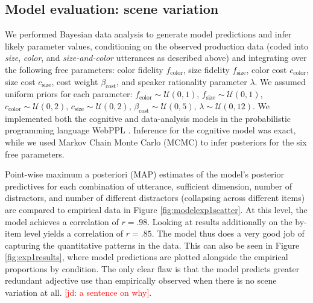 \documentclass[11pt]{article}
\newcommand{\jd}[1]{\textcolor{Red}{[jd: #1]}}
\newcommand{\figref}[1]{Figure \ref{#1}}
\begin{document}
\subsection{Model evaluation: scene variation}
\label{sec:modifiermodeleval}


We performed Bayesian data analysis to generate model predictions and infer likely parameter values, conditioning on the observed production data (coded into \emph{size}, \emph{color}, and \emph{size-and-color} utterances as described above) and integrating over the following free parameters: color fidelity $f_{\textrm{color}}$, size fidelity $f_{\textrm{size}}$, color cost $c_{\textrm{color}}$, size cost $c_{\textrm{size}}$, cost weight $\beta_{\textrm{cost}}$, and speaker rationality parameter $\lambda$. We assumed uniform priors for each parameter: $f_{\textrm{color}} \sim \mathcal{U}(0,1)$, $f_{\textrm{size}} \sim \mathcal{U}(0,1)$, $c_{\textrm{color}} \sim \mathcal{U}(0,2)$, $c_{\textrm{size}} \sim \mathcal{U}(0,2)$, $\beta_{\textrm{cost}} \sim \mathcal{U}(0,5)$, $\lambda  \sim \mathcal{U}(0,12)$.
We implemented both the cognitive and data-analysis models in the probabilistic programming language WebPPL \cite{GoodmanStuhlmuller14_DIPPL}.
Inference for the cognitive model was exact, while we used Markov Chain Monte Carlo (MCMC) to infer posteriors for the six free parameters.

Point-wise maximum a posteriori (MAP) estimates of the model's posterior predictives for each combination of utterance, sufficient dimension, number of distractors, and number of different distractors (collapsing across different items) are compared to empirical data in \figref{fig:modelexp1scatter}. At this level, the model achieves a correlation of $r = .98$. Looking at results additionally on the by-item level yields a correlation of $r = .85$. The model thus does a very good job of capturing the quantitative patterns in the data. This can also be seen in \figref{fig:exp1results}, where model predictions are plotted alongside the empirical proportions by condition. The only clear flaw is that the model predicts greater redundant adjective use than empirically observed when there is no scene variation at all. \jd{a sentence on why}.
\end{document}
